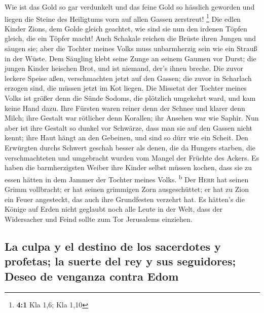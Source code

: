  Wie ist das Gold so gar verdunkelt und das feine Gold so
hässlich geworden und liegen die Steine des Heiligtums vorn auf allen
Gassen zerstreut! \footnote{\textbf{4:1} Kla 1,6; Kla 1,10}
 Die edlen Kinder Zions, dem Golde gleich geachtet, wie
sind sie nun den irdenen Töpfen gleich, die ein Töpfer macht!
 Auch Schakale reichen die Brüste ihren Jungen und säugen
sie; aber die Tochter meines Volks muss unbarmherzig sein wie ein Strauß
in der Wüste.  Dem Säugling klebt seine Zunge an seinem
Gaumen vor Durst; die jungen Kinder heischen Brot, und ist niemand,
der's ihnen breche.  Die zuvor leckere Speise aßen,
verschmachten jetzt auf den Gassen; die zuvor in Scharlach erzogen sind,
die müssen jetzt im Kot liegen.  Die Missetat der Tochter
meines Volks ist größer denn die Sünde Sodoms, die plötzlich umgekehrt
ward, und kam keine Hand dazu.  Ihre Fürsten waren reiner
denn der Schnee und klarer denn Milch; ihre Gestalt war rötlicher denn
Korallen; ihr Ansehen war wie Saphir.  Nun aber ist ihre
Gestalt so dunkel vor Schwärze, dass man sie auf den Gassen nicht kennt;
ihre Haut hängt an den Gebeinen, und sind so dürr wie ein Scheit.
 Den Erwürgten durchs Schwert geschah besser als denen,
die da Hungers starben, die verschmachteten und umgebracht wurden vom
Mangel der Früchte des Ackers.  Es haben die
barmherzigsten Weiber ihre Kinder selbst müssen kochen, dass sie zu
essen hätten in dem Jammer der Tochter meines Volks. \textsuperscript{b}
 Der \textsc{Herr} hat seinen Grimm vollbracht; er hat
seinen grimmigen Zorn ausgeschüttet; er hat zu Zion ein Feuer
angesteckt, das auch ihre Grundfesten verzehrt hat.  Es
hätten's die Könige auf Erden nicht geglaubt noch alle Leute in der
Welt, dass der Widersacher und Feind sollte zum Tor Jerusalems
einziehen.

\hypertarget{la-culpa-y-el-destino-de-los-sacerdotes-y-profetas-la-suerte-del-rey-y-sus-seguidores-deseo-de-venganza-contra-edom}{%
\subsection{La culpa y el destino de los sacerdotes y profetas; la
suerte del rey y sus seguidores; Deseo de venganza contra
Edom}\label{la-culpa-y-el-destino-de-los-sacerdotes-y-profetas-la-suerte-del-rey-y-sus-seguidores-deseo-de-venganza-contra-edom}}

